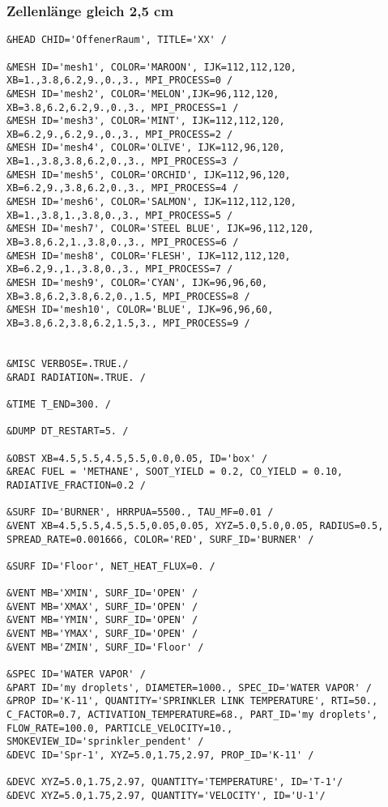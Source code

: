\subsubsection{Zellenlänge gleich 2,5 cm}
\begin{lstlisting}[emptylines=0,basicstyle=\tiny]
&HEAD CHID='OffenerRaum', TITLE='XX' /

&MESH ID='mesh1', COLOR='MAROON', IJK=112,112,120, XB=1.,3.8,6.2,9.,0.,3., MPI_PROCESS=0 /
&MESH ID='mesh2', COLOR='MELON',IJK=96,112,120, XB=3.8,6.2,6.2,9.,0.,3., MPI_PROCESS=1 /
&MESH ID='mesh3', COLOR='MINT', IJK=112,112,120, XB=6.2,9.,6.2,9.,0.,3., MPI_PROCESS=2 /
&MESH ID='mesh4', COLOR='OLIVE', IJK=112,96,120, XB=1.,3.8,3.8,6.2,0.,3., MPI_PROCESS=3 /
&MESH ID='mesh5', COLOR='ORCHID', IJK=112,96,120, XB=6.2,9.,3.8,6.2,0.,3., MPI_PROCESS=4 /
&MESH ID='mesh6', COLOR='SALMON', IJK=112,112,120, XB=1.,3.8,1.,3.8,0.,3., MPI_PROCESS=5 /
&MESH ID='mesh7', COLOR='STEEL BLUE', IJK=96,112,120, XB=3.8,6.2,1.,3.8,0.,3., MPI_PROCESS=6 /
&MESH ID='mesh8', COLOR='FLESH', IJK=112,112,120, XB=6.2,9.,1.,3.8,0.,3., MPI_PROCESS=7 /
&MESH ID='mesh9', COLOR='CYAN', IJK=96,96,60, XB=3.8,6.2,3.8,6.2,0.,1.5, MPI_PROCESS=8 /
&MESH ID='mesh10', COLOR='BLUE', IJK=96,96,60, XB=3.8,6.2,3.8,6.2,1.5,3., MPI_PROCESS=9 /


&MISC VERBOSE=.TRUE./
&RADI RADIATION=.TRUE. /

&TIME T_END=300. /

&DUMP DT_RESTART=5. /

&OBST XB=4.5,5.5,4.5,5.5,0.0,0.05, ID='box' /
&REAC FUEL = 'METHANE', SOOT_YIELD = 0.2, CO_YIELD = 0.10, RADIATIVE_FRACTION=0.2 /

&SURF ID='BURNER', HRRPUA=5500., TAU_MF=0.01 /
&VENT XB=4.5,5.5,4.5,5.5,0.05,0.05, XYZ=5.0,5.0,0.05, RADIUS=0.5, SPREAD_RATE=0.001666, COLOR='RED', SURF_ID='BURNER' /

&SURF ID='Floor', NET_HEAT_FLUX=0. /

&VENT MB='XMIN', SURF_ID='OPEN' /  
&VENT MB='XMAX', SURF_ID='OPEN' /  
&VENT MB='YMIN', SURF_ID='OPEN' /  
&VENT MB='YMAX', SURF_ID='OPEN' / 
&VENT MB='ZMIN', SURF_ID='Floor' /
 
&SPEC ID='WATER VAPOR' /
&PART ID='my droplets', DIAMETER=1000., SPEC_ID='WATER VAPOR' /
&PROP ID='K-11', QUANTITY='SPRINKLER LINK TEMPERATURE', RTI=50., C_FACTOR=0.7, ACTIVATION_TEMPERATURE=68., PART_ID='my droplets', FLOW_RATE=100.0, PARTICLE_VELOCITY=10., SMOKEVIEW_ID='sprinkler_pendent' /
&DEVC ID='Spr-1', XYZ=5.0,1.75,2.97, PROP_ID='K-11' /

&DEVC XYZ=5.0,1.75,2.97, QUANTITY='TEMPERATURE', ID='T-1'/
&DEVC XYZ=5.0,1.75,2.97, QUANTITY='VELOCITY', ID='U-1'/



\end{lstlisting}
